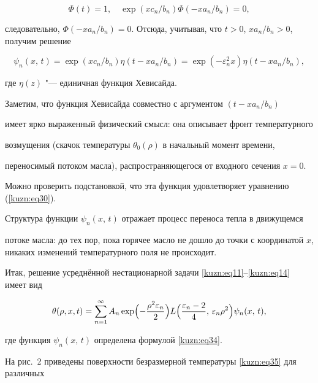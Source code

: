 $$

\Phi (t) = 1,\quad  \exp(x c_n/b_n) \Phi (-x a_n/b_n)= 0,$$

следовательно, $\Phi (- x a_n/b_n) = 0$. Отсюда, учитывая, что $t  > 0$, $xa_n/b_n > 0$, получим решение

\begin{equation}

\label{kuzn:eq34}

\psi_n(x,\,t) = \exp(x c_n/b_n)\eta (t- x a_n/b_n)=\exp (-\varepsilon _n^2 x )\eta (t- x a_n/b_n),

\end{equation}

где $\eta(z)$ "--- единичная функция Хевисайда. 

Заметим, что функция Хевисайда совместно с аргументом $(t- x a_n/b_n)$

имеет ярко выраженный физический смысл: она описывает фронт температурного

возмущения (скачок температуры $\theta_0(\rho)$ в начальный момент времени,

переносимый потоком масла), распространяющегося от входного сечения $x = 0$.

Можно проверить подстановкой, что эта функция удовлетворяет уравнению (\ref{kuzn:eq30}).

Структура функции $\psi_n(x,\,t)$ отражает процесс переноса тепла в движущемся

потоке масла: до тех пор, пока горячее масло не дошло до точки с координатой $x$, никаких изменений температурного поля не происходит.



Итак, решение усреднённой нестационарной задачи \eqref{kuzn:eq11}--\eqref{kuzn:eq14} имеет вид

\begin{equation}

\label{kuzn:eq35}

\theta (\rho,x,t)=\sum\limits_{n=1}^\infty A_n \exp \Bigl( -\frac{\rho^2\varepsilon_n }{2}\Bigr)

L\Bigl(\frac{\varepsilon _n -2}{4},\,\varepsilon _n \rho ^2 \Bigr)\psi _n (x,\,t),

\end{equation}

где функция $\psi_n(x,\,t)$ определена формулой \eqref{kuzn:eq34}.



На рис.~2 приведены поверхности безразмерной температуры \eqref{kuzn:eq35} для различных

